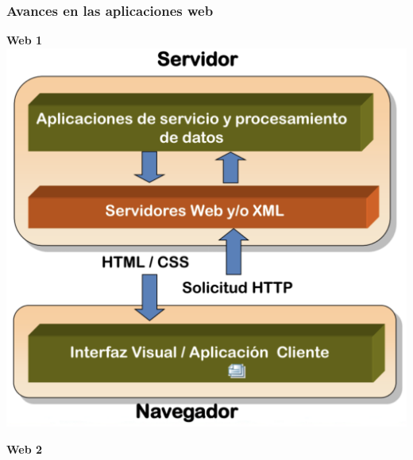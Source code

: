 \documentclass[
10pt, %
aspectratio=169, %
]{beamer}
\begin{document}
	\begin{frame}
		
		\frametitle{Avances en las aplicaciones web}
		
		\begin{minipage}[t]{0.4\textwidth} %
			
			\centering 
			\textbf{Web 1}\\[2mm]
			
			\includegraphics[scale=0.35]{modelo-web1.png} 
			
		\end{minipage}
		\hfill  %
		\begin{minipage}[t]{0.4\textwidth} %
			
			\centering 
			\textbf{Web 2}\\[2mm]
			

\end{minipage}
\end{frame}
\end{document}
